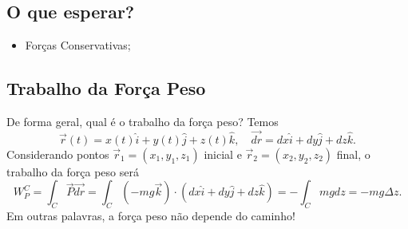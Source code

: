 \documentclass{article}
\begin{document}
\subsection{O que esperar?}
\begin{itemize}
  \item For\c cas Conservativas;
\end{itemize}
\subsection{Trabalho da For\c ca Peso}
  De forma geral, qual é o trabalho da for\c ca peso? Temos 
    \[
      \vec{r}(t) = x(t)\hat{i} + y(t)\hat{j} + z(t)\hat{k},\quad \vec{dr} = dx \hat{i} + dy \hat{j} + dz \hat{k}.
    \]
  Considerando pontos \(\vec{r}_{1} = (x_{1}, y_{1}, z_{1})\) inicial e \(\vec{r}_{2} = (x_{2}, y_{2}, z_{2})\) final, o trabalho da for\c ca peso será 
    \[
      W_{P}^{C} = \int_{C}^{} \vec{P} \vec{dr} = \int_{C}^{}(-mg \vec{k})\cdot (dx \hat{i} + dy \hat{j} + dz \hat{k}) = - \int_{C}^{}mgdz = -mg\Delta z.
    \]
  Em outras palavras, a for\c ca peso não depende do caminho!
\end{document}
